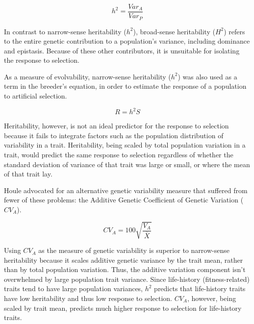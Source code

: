 \documentclass[PhD]{msu-thesis}
\begin{document}
\begin{equation}
h^2 = \frac{Var_A}{Var_P}
\end{equation}

In contrast to narrow-sense heritability ($h^2$), broad-sense heritability ($H^2$) refers to the entire genetic contribution to a population’s variance, including dominance and epistasis. Because of these other contributors, it is unsuitable for isolating the response to selection. 

As a measure of evolvability, narrow-sense heritability ($h^2$) was also used as a term in the breeder’s equation, in order to estimate the response of a population to artificial selection.

\begin{equation}
R = {h^2}S
\end{equation}

Heritability, however, is not an ideal predictor for the response to selection because it fails to integrate factors such as the population distribution of variability in a trait\cite{houle_comparing_1992}. Heritability, being scaled by total population variation in a trait, would predict the same response to selection regardless of whether the standard deviation of variance of that trait was large or small, or where the mean of that trait lay.

Houle advocated for an alternative genetic variability measure that suffered from fewer of these problems: the Additive Genetic Coefficient of Genetic Variation ($CV_A$).

\begin{equation}
CV_A = 100\sqrt{\frac{V_A}{\bar X}}
\end{equation}

Using $CV_A$ as the measure of genetic variability is superior to narrow-sense heritability because it scales additive genetic variance by the trait mean, rather than by total population variation. Thus, the additive variation component isn’t overwhelmed by large population trait variance\cite{hansen_measuring_2008}. Since life-history (fitness-related) traits tend to have large population variances, $h^2$ predicts that life-history traits have low heritability and thus low response to selection\cite{price_low_1991}. $CV_A$, however, being scaled by trait mean, predicts much higher response to selection for life-history traits\cite{hansen_heritability_2011,houle_comparing_1992}.
\end{document}
